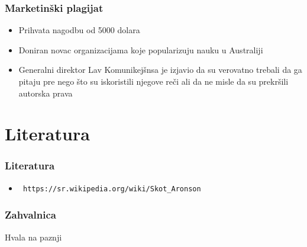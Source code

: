 \documentclass{beamer}
\begin{document}
\begin{frame}[fragile]\frametitle{Marketinški plagijat}
	\begin{itemize}
		\item<1-> Prihvata nagodbu od 5000 dolara
		\item<2-> Doniran novac organizacijama koje popularizuju nauku u Australiji
		\item<3-> Generalni direktor Lav Komunikejšnsa je izjavio da su verovatno trebali da ga pitaju 
		pre nego što su iskoristili njegove reči ali da ne misle da su prekršili autorska prava
		
	\end{itemize}
\end{frame}

\section{Literatura}
\begin{frame}[fragile]\frametitle{Literatura}
	\begin{itemize}
	\item \begin{verbatim} https://sr.wikipedia.org/wiki/Skot_Aronson \end{verbatim}
	\end{itemize}
\end{frame}

\begin{frame}[fragile]\frametitle{Zahvalnica}
	\thispagestyle{empty}
	\begin{center}
		{\Huge Hvala na paznji}
	\end{center}	
\end{frame}


		


			
\end{document}
